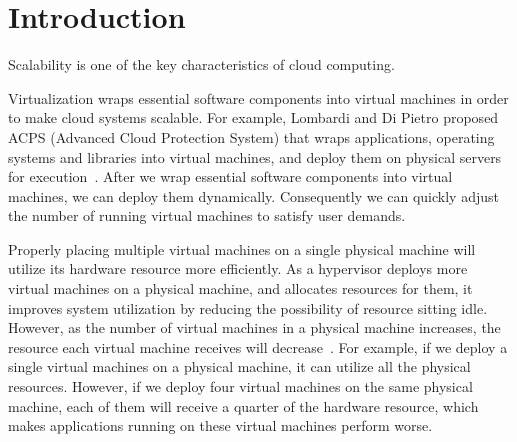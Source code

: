 \section{Introduction}\label{sec:intro}


Scalability is one of the key characteristics of cloud computing.


Virtualization wraps essential software components into virtual machines
in order to make cloud systems scalable.
For example, Lombardi and Di Pietro proposed ACPS (Advanced Cloud
Protection System) that wraps applications, operating systems and
libraries into virtual machines, and deploy them on physical servers for
execution~\cite{cite:secure_virt_for_cloud, cite:cloud_issue}.
After we wrap essential software components into virtual machines, we
can deploy them dynamically.
Consequently we can quickly adjust the number of running virtual
machines to satisfy user demands.



Properly placing multiple virtual machines on a single physical machine
will utilize its hardware resource more efficiently.
As a hypervisor deploys more virtual machines on a physical machine, and
allocates resources for them, it improves system utilization by reducing
the possibility of resource sitting idle.
However, as the number of virtual machines in a physical machine
increases, the resource each virtual machine receives will
decrease~\cite{cite:resource_overbooking}.
For example, if we deploy a single virtual machines on a physical
machine, it can utilize all the physical resources.
However, if we deploy four virtual machines on the same physical
machine, each of them will receive a quarter of the hardware resource,
which makes applications running on these virtual machines perform
worse.

